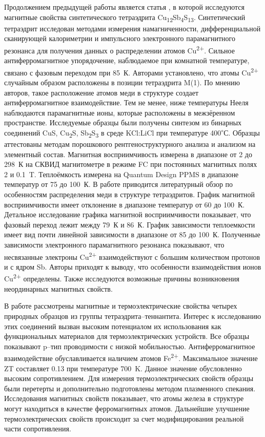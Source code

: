 Продолжением предыдущей работы является статья \cite{DiBenedetto2005}, в которой исследуются магнитные свойства синтетического тетраэдрита Cu\textsubscript{12}Sb\textsubscript{4}S\textsubscript{13}. Синтетический тетраэдрит исследован методами измерения намагниченности, дифференциальной сканирующей калориметрии и импульсного электронного парамагнитного резонанса для получения данных о распределении атомов Cu\textsuperscript{2+}.
Сильное антиферромагнитное упорядочение, наблюдаемое при комнатной температуре, связано с фазовым переходом при 85~К. Авторами установлено, что атомы Cu\textsuperscript{2+} случайным образом расположены в позиции тетраэдрита M(1). По мнению авторов, такое расположение атомов меди в структуре создает антиферромагнитное взаимодействие. Тем не менее, ниже температуры Нееля наблюдаются парамагнитные ионы, которые расположены в межзёренном пространстве. Исследуемые образцы были получены синтезом из бинарных соединений CuS, Cu\textsubscript{2}S, Sb\textsubscript{2}S\textsubscript{3} в среде KCl:LiCl при температуре 400\textsuperscript{$\circ$}С. Образцы аттестованы методам порошкового рентгеноструктурного анализа и анализом на элементный состав. Магнитная восприимчивость измерена в диапазоне от 2 до 298~К на СКВИД магнитометре в режиме FC при постоянных магнитных полях 2 и 0.1~T. Теплоёмкость измерена на Quantum Design
PPMS в диапазоне температур от 75 до 100~К. В работе приводится литературный обзор по особенностям распределения меди в структуре тетраэдритов. График магнитной восприимчивости имеет отклонение в диапазоне температур от 60 до 100~К. Детальное исследование графика магнитной восприимчивости показывает, что фазовый переход лежит между 79~К и 86~К. График зависимости теплоемкости имеет вид почти линейной зависимости в диапазоне от 85 до 100~К. Полученные зависимости электронного парамагнитного резонанса показывают, что несвязанные электроны Cu\textsuperscript{2+} взаимодействуют с большим количеством протонов и с ядром Sb. Авторы приходят к выводу, что особенности взаимодействия ионов Cu\textsuperscript{2+} определены. Также исследуются возможные причины возникновения неординарных магнитных свойств.



В работе \cite{Levinsky_2015} рассмотрены магнитные и термоэлектрические свойства четырех природных образцов из группы тетраэдрита--теннантита. Интерес к исследованию этих соединений вызван высоким потенциалом их использования как функциональных материалов для термоэлектрических устройств. Все образцы показывают p--тип проводимости с низкой мобильностью. Антиферромагнитное взаимодействие обуславливается наличием атомов Fe\textsuperscript{2+}. Максимальное значение ZT составляет 0.13 при температуре 700~K. Данное значение обусловленно высоким сопротивлением. Для измерения термоэлектрических свойств образцы были перетерты и дополнительно подготовлены методом плазменного спекания. Исследования магнитных свойств показывает, что  атомы железа в структуре могут находиться в качестве ферромагнитных атомов. Дальнейшие улучшение термоэлектрических свойств происходит за счет модифицирования реальной части сопротивления.

